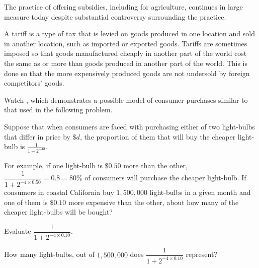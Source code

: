\documentclass{ximera}
\begin{document}
The practice of offering subsidies, including for agriculture, continues in large measure today despite substantial controversy surrounding the practice.

A tariff is a type of tax that is levied on goods produced in one location and sold in another location, such as imported or exported goods. Tariffs are sometimes imposed so that goods manufactured cheaply in another part of the world cost the same as or more than goods produced in another part of the world. This is done so that the more expensively produced goods are not undersold by foreign competitors' goods.

\begin{question}
Watch , which demonstrates a possible model of consumer purchases similar to that used in the following problem.

Suppose that when consumers are faced with purchasing either of two light-bulbs that differ in price by $\$d$, the proportion of them that will buy the cheaper light-bulb is $\displaystyle \frac{1}{1+2^{-4d}}$.
\begin{image}
\end{image}
For example, if one light-bulb is $\$0.50$ more than the other, $\dfrac{1}{1+2^{-4\times 0.50}}=0.8=80\%$ of consumers will purchase the cheaper light-bulb.
If consumers in coastal California buy $1,500,000$ light-bulbs in a given month and one of them is $\$0.10$ more expensive than the other, about how many of the cheaper light-bulbs will be bought?


 \begin{multipleChoice}
    \end{multipleChoice}
\begin{hint}
Evaluate $\dfrac{1}{1+2^{-4\times 0.10}}$.
\end{hint}
\begin{hint}
How many light-bulbs, out of $1,500,000$ does $\dfrac{1}{1+2^{-4\times 0.10}}$ represent?
\end{hint}

\end{question}
\end{document}

